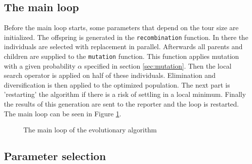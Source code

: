 \documentclass[a4paper,10pt]{article}
\newcommand{\ReplaceMe}[1]{{\color{blue}#1}}
\begin{document}
\subsection{The main loop}


Before the main loop starts, some parameters that depend on the tour size are initialized. The offspring is generated in the \texttt{recombination} function. In there the individuals are selected with replacement in parallel. Afterwards all parents and children are supplied to the \texttt{mutation} function. This function applies mutation with a given probability $\alpha$ specified in section \ref{sec:mutation}. Then the local search operator is applied on half of these individuals. Elimination and diversification is then applied to the optimized population. The next part is 'restarting' the algorithm if there is a risk of settling in a local minimum. Finally the results of this generation are sent to the reporter and the loop is restarted. The main loop can be seen in Figure \ref{code:main}.

\begin{figure}
\caption{The main loop of the evolutionary algorithm}
\label{code:main}
\end{figure}


\subsection{Parameter selection} \label{sec:hyperparameter}

\end{document}
